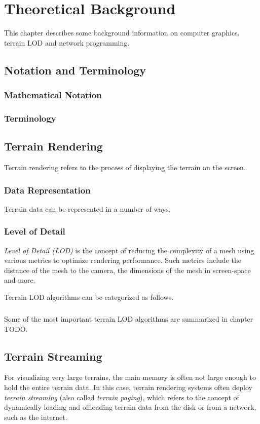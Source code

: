 \chapter{Theoretical Background}
This chapter describes some background information 
on computer graphics, terrain LOD and network programming.

\section{Notation and Terminology}
\subsection{Mathematical Notation}

\subsection{Terminology}

\section{Terrain Rendering}
Terrain rendering refers to the process of displaying the terrain on the screen.

\subsection{Data Representation}
Terrain data can be represented in a number of ways.

\subsection{Level of Detail}
\textit{Level of Detail (LOD)} is the concept of reducing the complexity of a mesh 
using various metrics to optimize rendering performance.
Such metrics include the distance of the mesh to the camera,
the dimensions of the mesh in screen-space and more.

Terrain LOD algorithms can be categorized as follows.

\paragraph{}

Some of the most important terrain LOD algorithms are summarized in 
chapter TODO.

\section{Terrain Streaming}
For visualizing very large terrains, 
the main memory is often not large enough to hold the entire terrain data.
In this case, terrain rendering systems often deploy 
\textit{terrain streaming} (also called \textit{terrain paging}), which refers to the concept of dynamically 
loading and offloading terrain data from the disk or from a network, such as the internet.

